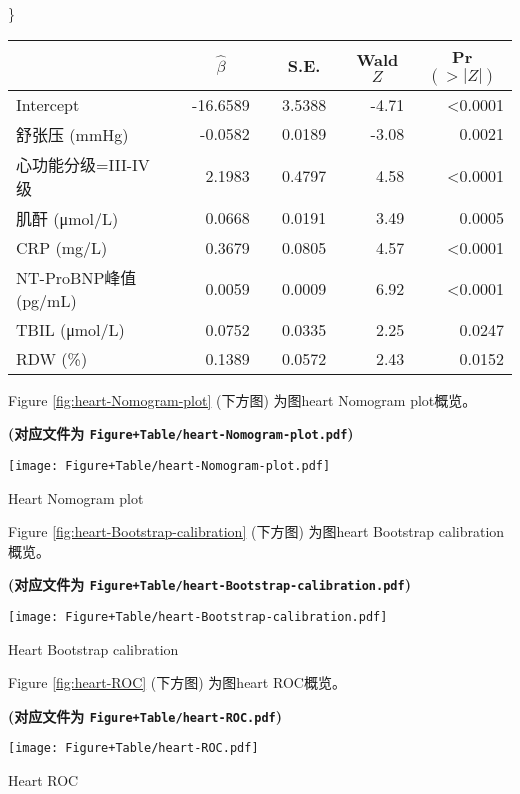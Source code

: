 \documentclass[
]{article}
\begin{document}
\}

\setlongtables

\begin{longtable}{lrrrr}\hline
\multicolumn{1}{l}{}&\multicolumn{1}{c}{$\hat{\beta}$}&\multicolumn{1}{c}{S.E.}&\multicolumn{1}{c}{Wald $Z$}&\multicolumn{1}{c}{Pr$(>|Z|)$}\tabularnewline
\hline
\endhead
\hline
\endfoot
Intercept&~-16.6589~&~3.5388~&-4.71&\textless 0.0001\tabularnewline
舒张压 (mmHg)&~ -0.0582~&~0.0189~&-3.08&0.0021\tabularnewline
心功能分级=III-IV 级&~  2.1983~&~0.4797~& 4.58&\textless 0.0001\tabularnewline
肌酐 (μmol/L)&~  0.0668~&~0.0191~& 3.49&0.0005\tabularnewline
CRP (mg/L)&~  0.3679~&~0.0805~& 4.57&\textless 0.0001\tabularnewline
NT-ProBNP峰值 (pg/mL)&~  0.0059~&~0.0009~& 6.92&\textless 0.0001\tabularnewline
TBIL (μmol/L)&~  0.0752~&~0.0335~& 2.25&0.0247\tabularnewline
RDW (\%)&~  0.1389~&~0.0572~& 2.43&0.0152\tabularnewline
\hline
\end{longtable}
\addtocounter{table}{-1}

Figure \ref{fig:heart-Nomogram-plot} (下方图) 为图heart Nomogram plot概览。

\textbf{(对应文件为 \texttt{Figure+Table/heart-Nomogram-plot.pdf})}

\def\@captype{figure}
\begin{center}
\texttt{[image: Figure+Table/heart-Nomogram-plot.pdf]}
\caption{Heart Nomogram plot}\label{fig:heart-Nomogram-plot}
\end{center}

Figure \ref{fig:heart-Bootstrap-calibration} (下方图) 为图heart Bootstrap calibration概览。

\textbf{(对应文件为 \texttt{Figure+Table/heart-Bootstrap-calibration.pdf})}

\def\@captype{figure}
\begin{center}
\texttt{[image: Figure+Table/heart-Bootstrap-calibration.pdf]}
\caption{Heart Bootstrap calibration}\label{fig:heart-Bootstrap-calibration}
\end{center}

Figure \ref{fig:heart-ROC} (下方图) 为图heart ROC概览。

\textbf{(对应文件为 \texttt{Figure+Table/heart-ROC.pdf})}

\def\@captype{figure}
\begin{center}
\texttt{[image: Figure+Table/heart-ROC.pdf]}
\caption{Heart ROC}\label{fig:heart-ROC}
\end{center}
\end{document}
